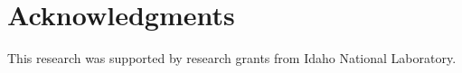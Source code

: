 \documentclass[11pt]{article}
\begin{document}
%
%
%
%
\section{Acknowledgments}
This research was supported by research grants from Idaho National Laboratory.

\newpage


\end{document}
